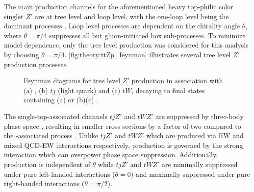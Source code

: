 \documentclass[../thesis.tex]{subfiles}
\begin{document}
The main production channels for the aforementioned heavy top-philic color singlet $Z'$ are at tree level and loop level, with the one-loop level being the dominant processes \citep{theory:ttZp}. Loop level processes are dependent on the chirality angle $\theta$, where $\theta=\pi/4$ suppresses all but gluon-initiated box sub-processes. To minimize model dependence, only the tree level production was considered for this analysis by choosing $\theta=\pi/4$. \autoref{fig:theory:ttZp_feynman} illustrates several tree level $Z'$ production processes.

\begin{figure}[!htbp]
\centering
{}
\caption[Feynman diagrams for tree level $Z'$ production in association with (a) \ttbar, (b) $tj$ (light quark) and (c) $tW$, decaying to final states containing (a) \tttt or (b)(c) \ttt.]{\label{fig:theory:ttZp_feynman}Feynman diagrams for tree level $Z'$ production in association with (a) \ttbar, (b) $tj$ (light quark) and (c) $tW$, decaying to final states containing (a) \tttt or (b)(c) \ttt \citep{theory:ttZp}.}
\end{figure}

The single-top-associated channels $tjZ'$ and $tWZ'$ are suppressed by three-body phase space \citep{theory:ttZp}, resulting in smaller cross sections by a factor of two compared to the \ttbar-associated process \ttZp. Unlike $tjZ'$ and $tWZ'$ which are produced via \acs{EW} and mixed \acs{QCD}-\acs{EW} interactions respectively, \tttt production is governed by the strong interaction which can overpower phase space suppression. Additionally, \tttt production is independent of $\theta$ while $tjZ'$ and $tWZ'$ are minimally suppressed under pure left-handed interactions ($\theta=0$) and maximally suppressed under pure right-handed interactions ($\theta=\pi/2$).
\end{document}
